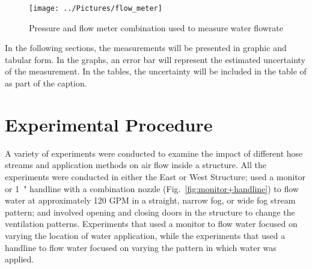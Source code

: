 \documentclass[12pt,oneside]{book}
\begin{document}
\begin{figure}[!ht]
\texttt{[image: ../Pictures/flow\_meter]}
\caption[Picture of Flowrate Meter]{Pressure and flow meter combination used to measure water flowrate}
\label{fig:flow_meter}
\end{figure}
\FloatBarrier

In the following sections, the measurements will be presented in graphic and tabular form. In the graphs, an error bar will represent the estimated uncertainty of the measurement. In the tables, the uncertainty will be included in the table of as part of the caption.

\section{Experimental Procedure}
\label{sec:Experimental_Procedure}

A variety of experiments were conducted to examine the impact of different hose streams and application methods on air flow inside a structure. All the experiments were conducted in either the East or West Structure; used a monitor %
or 1~" handline with a combination nozzle (Fig.~\ref{fig:monitor+handline}) to flow water at approximately 120 GPM in a straight, narrow fog, or wide fog stream pattern; and involved opening and closing doors in the structure to change the ventilation patterns. Experiments that used a monitor to flow water focused on varying the location of water application, while the experiments that used a handline to flow water focused on varying the pattern in which water was applied.
\end{document}
